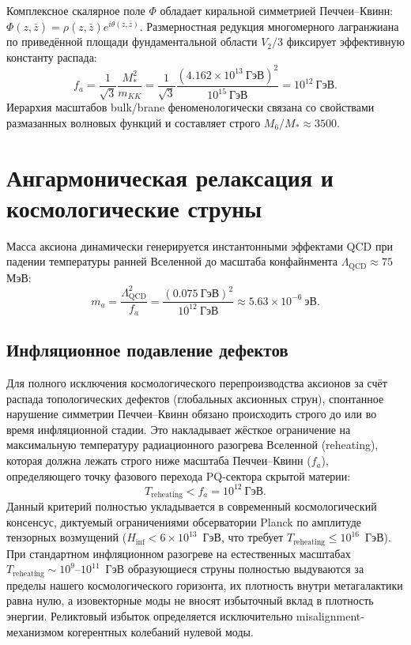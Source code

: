 \documentclass[12pt,a4paper]{article}
\begin{document}
Комплексное скалярное поле $\Phi$ обладает киральной симметрией Печчеи--Квинн: $\Phi(z,\bar{z}) = \rho(z,\bar{z}) e^{i\theta(z,\bar{z})}$. Размерностная редукция многомерного лагранжиана по приведённой площади фундаментальной области $V_2/3$ фиксирует эффективную константу распада:
\begin{equation}
\boxed{\; f_a = \frac{1}{\sqrt{3}} \frac{M_*^2}{m_{KK}} = \frac{1}{\sqrt{3}} \frac{(4.162 \times 10^{13} \ \text{ГэВ})^2}{10^{15} \ \text{ГэВ}} = 10^{12} \ \text{ГэВ}. \;}
\end{equation}
Иерархия масштабов bulk/brane феноменологически связана со свойствами размазанных волновых функций и составляет строго $M_6 / M_* \approx 3500$.

\section{Ангармоническая релаксация и космологические струны}
Масса аксиона динамически генерируется инстантонными эффектами QCD при падении температуры ранней Вселенной до масштаба конфайнмента $\Lambda_{\text{QCD}} \approx 75$ МэВ:
\begin{equation}
m_a = \frac{\Lambda_{\text{QCD}}^2}{f_a} = \frac{(0.075 \ \text{ГэВ})^2}{10^{12} \ \text{ГэВ}} \approx 5.63 \times 10^{-6} \ \text{эВ}.
\end{equation}

\subsection*{Инфляционное подавление дефектов}
Для полного исключения космологического перепроизводства аксионов за счёт распада топологических дефектов (глобальных аксионных струн), спонтанное нарушение симметрии Печчеи--Квинн обязано происходить строго до или во время инфляционной стадии. Это накладывает жёсткое ограничение на максимальную температуру радиационного разогрева Вселенной (reheating), которая должна лежать строго ниже масштаба Печчеи--Квинн ($f_a$), определяющего точку фазового перехода PQ-сектора скрытой материи:
\begin{equation}
T_{\text{reheating}} < f_a = 10^{12} \ \text{ГэВ}.
\end{equation}
Данный критерий полностью укладывается в современный космологический консенсус, диктуемый ограничениями обсерватории Planck по амплитуде тензорных возмущений ($H_{\text{inf}} < 6 \times 10^{13}$~ГэВ, что требует $T_{\text{reheating}} \le 10^{16}$~ГэВ). При стандартном инфляционном разогреве на естественных масштабах $T_{\text{reheating}} \sim 10^9\text{--}10^{11}$~ГэВ образующиеся струны полностью выдуваются за пределы нашего космологического горизонта, их плотность внутри метагалактики равна нулю, а изовекторные моды не вносят избыточный вклад в плотность энергии. Реликтовый избыток определяется исключительно misalignment-механизмом когерентных колебаний нулевой моды.
\end{document}
